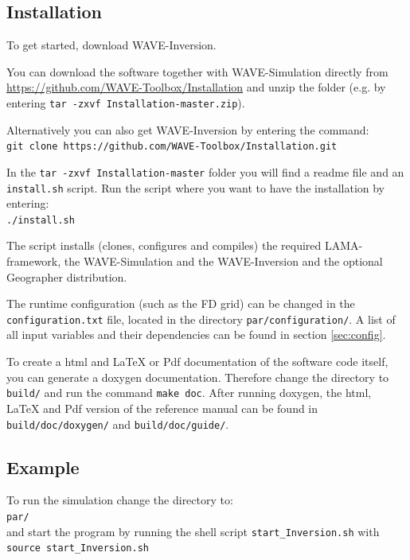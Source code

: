 \documentclass[pdftex,a4paper,parskip,listof=totoc,bibliography=totoc,onehalfspacing,12pt]{scrreprt}
\newcommand{\shellcmd}[1]{\indent\indent\texttt{#1}}	%
\newcommand{\shellcmdline}[1]{\indent\indent\texttt{\quad#1}} 	%
\begin{document}

\subsection{Installation}
To get started, download WAVE-Inversion. 

You can download the software together with WAVE-Simulation directly from \url{https://github.com/WAVE-Toolbox/Installation} and unzip the folder (e.g. by entering \shellcmd{tar -zxvf Installation-master.zip}).

Alternatively you can also get WAVE-Inversion by entering the command: \\\shellcmdline{git clone https://github.com/WAVE-Toolbox/Installation.git}

In the \shellcmd{tar -zxvf Installation-master} folder you will find a readme file and an \shellcmd{install.sh} script. Run the script where you want to have the installation by entering: \\\shellcmdline{./install.sh}

The script installs (clones, configures and compiles) the required LAMA-framework, the WAVE-Simulation and the WAVE-Inversion and the optional Geographer distribution.

The runtime configuration (such as the FD grid) can be changed in the \shellcmd{configuration.txt} file, located in the directory \shellcmd{par/configuration/}. A list of all input variables and their dependencies can be found in section \ref{sec:config}. 

To create a html and LaTeX or Pdf documentation of the software code itself, you can generate a doxygen documentation. Therefore change the directory to \shellcmd{build/} and run the command \shellcmd{make doc}. After running doxygen, the html, LaTeX and Pdf version of the reference manual can be found in \shellcmd{build/doc/doxygen/} and \shellcmd{build/doc/guide/}.

\subsection{Example}

To run the simulation change the directory to: \\\shellcmdline{par/}\\
and start the program by running the shell script \shellcmd{start\_Inversion.sh} with  \\\shellcmdline{source start\_Inversion.sh}\\
\end{document}
